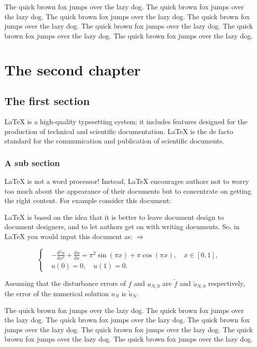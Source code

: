 \documentclass[openany,twoside,12pt]{book}
\theoremstyle{plain}
\numberwithin{equation}{chapter}
\numberwithin{figure}{chapter}
\numberwithin{table}{chapter}
\begin{document}
The quick brown fox jumps over the lazy dog. The quick brown fox jumps over the lazy dog. The quick brown fox jumps over the lazy dog. The quick brown fox jumps over the lazy dog. The quick brown fox jumps over the lazy dog. The quick brown fox jumps over the lazy dog. The quick brown fox jumps over the lazy dog.


\chapter{The second chapter}

\section{The first section}
LaTeX is a high-quality typesetting system; it includes features designed for the production of technical and scientific documentation. LaTeX is the de facto standard for the communication and publication of scientific documents.

\subsection{A sub section}
LaTeX is not a word processor! Instead, LaTeX encourages authors not to worry too much about the appearance of their documents but to concentrate on getting the right content. For example consider this document:

LaTeX is based on the idea that it is better to leave document design to document designers, and to let authors get on with writing documents. So, in LaTeX you would input this document as:
$ \Rightarrow $

\begin{equation}\label{eqn:1}
\left\{\begin{aligned}
  &-\frac{\mathrm{d}^{2} u}{\mathrm{d} x^{2}}+\frac{\mathrm{d} u}{\mathrm{d} x}=\pi^{2} \sin (\pi x)+\pi \cos (\pi x),\quad x \in [0,1], \\
  &u(0)=0,\quad u(1)=0.
\end{aligned} \right.
\end{equation}


Assuming that the disturbance errors of $f$ and $u_{N,0}$ are $\tilde{f}$ and $\tilde{u}_{N,0}$ respectively, the error of the numerical solution $u_N$ is $\tilde{u}_N$.


The quick brown fox jumps over the lazy dog. The quick brown fox jumps over the lazy dog. The quick brown fox jumps over the lazy dog. The quick brown fox jumps over the lazy dog. The quick brown fox jumps over the lazy dog. The quick brown fox jumps over the lazy dog. The quick brown fox jumps over the lazy dog.
\end{document}

